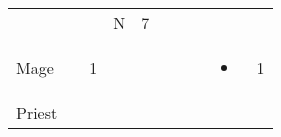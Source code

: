 \documentclass[12pt]{article}
\newcommand{\indexClass}[1]{\index{#1}}
\newcommand{\class}[1]{#1\indexClass{#1}}
\begin{document}
\begin{longtable}[]{@{}llllllllll@{}}
\begin{minipage}[t]{0.06\columnwidth}
\strut\end{minipage} &
\begin{minipage}[t]{0.06\columnwidth}\raggedright\strut
\strut\end{minipage} &
\begin{minipage}[t]{0.06\columnwidth}\raggedright\strut
\strut\end{minipage} &
\begin{minipage}[t]{0.07\columnwidth}\raggedright\strut
N
\strut\end{minipage} &
\begin{minipage}[t]{0.08\columnwidth}\raggedright\strut
7
\strut\end{minipage}\tabularnewline
\begin{minipage}[t]{0.13\columnwidth}\raggedright\strut
\class{Mage}
\strut\end{minipage} &
\begin{minipage}[t]{0.06\columnwidth}\raggedright\strut
\strut\end{minipage} &
\begin{minipage}[t]{0.06\columnwidth}\raggedright\strut
1
\strut\end{minipage} &
\begin{minipage}[t]{0.06\columnwidth}\raggedright\strut
\strut\end{minipage} &
\begin{minipage}[t]{0.06\columnwidth}\raggedright\strut
\strut\end{minipage} &
\begin{minipage}[t]{0.06\columnwidth}\raggedright\strut
\strut\end{minipage} &
\begin{minipage}[t]{0.06\columnwidth}\raggedright\strut
\strut\end{minipage} &
\begin{minipage}[t]{0.06\columnwidth}\raggedright\strut
\strut\end{minipage} &
\begin{minipage}[t]{0.07\columnwidth}\raggedright\strut
\begin{itemize}
\item
\end{itemize}
\strut\end{minipage} &
\begin{minipage}[t]{0.08\columnwidth}\raggedright\strut
1
\strut\end{minipage}\tabularnewline
\begin{minipage}[t]{0.13\columnwidth}\raggedright\strut
\class{Priest}

\end{minipage}
\end{longtable}
\end{document}
